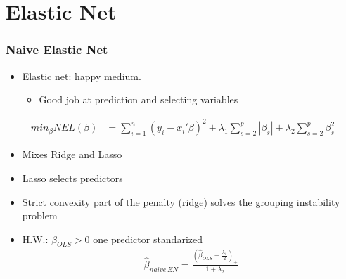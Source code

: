 \documentclass[
  shownotes,
  xcolor={svgnames},
  hyperref={colorlinks,citecolor=DarkBlue,linkcolor=DarkRed,urlcolor=DarkBlue}
  , aspectratio=169]{beamer}
\begin{document}
\section{Elastic Net}
\begin{frame}[fragile]
\frametitle{Naive Elastic Net}

\begin{itemize}
\item Elastic net: happy medium. 
  \begin{itemize}
    \item Good job at prediction and selecting variables
  \end{itemize}
\end{itemize}

\begin{align}
min_{\beta} NEL(\beta) &= \sum_{i=1}^n (y_i-x_i'\beta)^2 + \lambda_1 \sum_{s=2}^p |\beta_s| + \lambda_2 \sum_{s=2}^p \beta_s^2 
\end{align}


\begin{itemize}
 \item Mixes Ridge and Lasso
 \item Lasso selects predictors
 \item Strict convexity part  of the penalty (ridge) solves the grouping instability problem 
 \scriptsize
 \item H.W.: $\beta_{OLS}>0$ one predictor standarized
 \begin{align}
\hat{\beta}_{naive\,EN}= \frac{\left(\hat{\beta}_{OLS}-\frac{\lambda_1}{2}\right)_{+}}{1+\lambda_2}
\end{align}
\end{itemize}

\end{frame}
\end{document}
